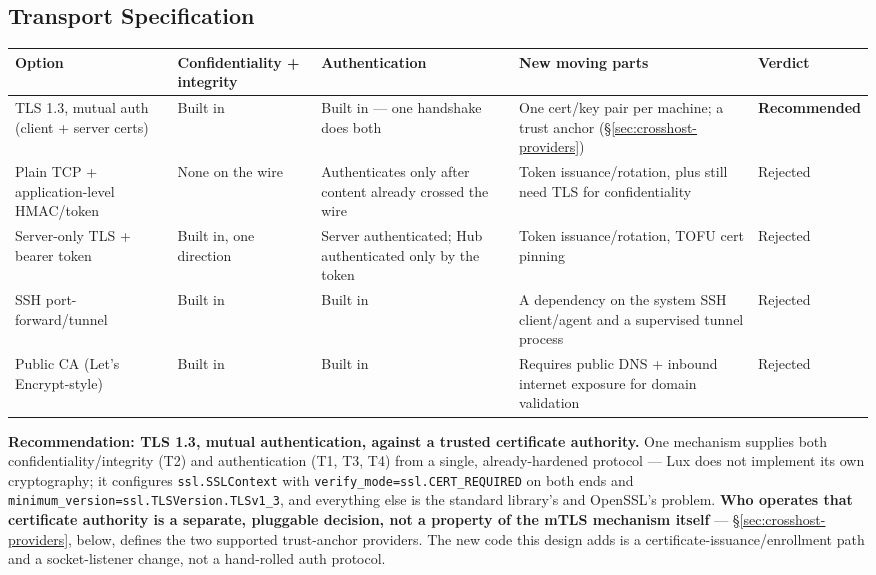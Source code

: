 \documentclass[a4paper,10pt]{article}
\newcommand{\field}[1]{\texttt{#1}}
\begin{document}
\subsection{Transport Specification}

\begin{center}
\begin{tabular}{p{3.2cm}p{2.4cm}p{2.4cm}p{2.3cm}p{1.5cm}}
\toprule
\textbf{Option} & \textbf{Confidentiality + integrity} & \textbf{Authentication} & \textbf{New moving parts} & \textbf{Verdict} \\
\midrule
TLS 1.3, mutual auth (client + server certs) & Built in & Built in --- one
  handshake does both & One cert/key pair per machine; a trust anchor
  (\S\ref{sec:crosshost-providers}) & \textbf{Recommended} \\
Plain TCP + application-level HMAC/token & None on the wire &
  Authenticates only after content already crossed the wire & Token
  issuance/rotation, plus still need TLS for confidentiality & Rejected \\
Server-only TLS + bearer token & Built in, one direction & Server
  authenticated; Hub authenticated only by the token & Token
  issuance/rotation, TOFU cert pinning & Rejected \\
SSH port-forward/tunnel & Built in & Built in & A dependency on the
  system SSH client/agent and a supervised tunnel process & Rejected \\
Public CA (Let's Encrypt-style) & Built in & Built in & Requires public
  DNS + inbound internet exposure for domain validation & Rejected \\
\bottomrule
\end{tabular}
\end{center}

\textbf{Recommendation: TLS 1.3, mutual authentication, against a
trusted certificate authority.}  One mechanism supplies both
confidentiality/integrity (T2) and authentication (T1, T3, T4) from a
single, already-hardened protocol --- Lux does not implement its own
cryptography; it configures \field{ssl.SSLContext} with
\field{verify\_mode=ssl.CERT\_REQUIRED} on both ends and
\field{minimum\_version=ssl.TLSVersion.TLSv1\_3}, and everything else is
the standard library's and OpenSSL's problem.  \textbf{Who operates that
certificate authority is a separate, pluggable decision, not a property of
the mTLS mechanism itself} --- \S\ref{sec:crosshost-providers}, below,
defines the two supported trust-anchor providers.  The new code this
design adds is a certificate-issuance/enrollment path and a
socket-listener change, not a hand-rolled auth protocol.
\end{document}
